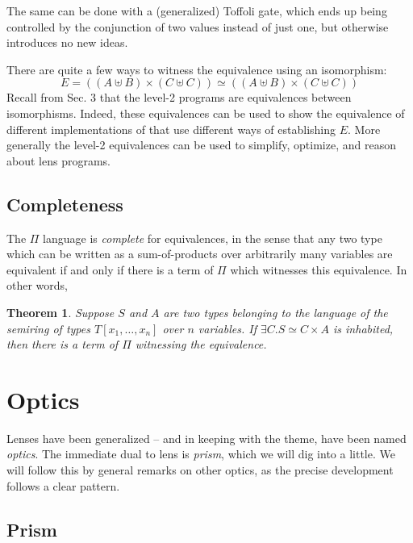 \documentclass[sigplan,review,anonymous]{acmart}
\newtheorem{theorem}{Theorem}[section]
\begin{document}
The same can be done with a (generalized) Toffoli gate, which ends up being
controlled by the conjunction of two values instead of just one, but otherwise
introduces no new ideas.

There are quite a few ways to witness the equivalence using an
isomorphism: \[ E = ((A ⊎ B) × (C ⊎ C)) ≃ ((A ⊎ B) × (C ⊎ C)) \]
Recall from Sec. 3 that the level-2 programs are equivalences between
isomorphisms. Indeed, these equivalences can be used to show the
equivalence of different implementations of 
that use different ways of establishing $E$. More generally the
level-2 equivalences can be used to simplify, optimize, and reason
about lens programs.



\subsection{Completeness}

The $\Pi$ language is \emph{complete} for equivalences, in the sense that
any two type which can be written as a sum-of-products over arbitrarily many
variables are equivalent if and only if there is a term of $\Pi$ which witnesses
this equivalence.  In other words,

\begin{theorem}
Suppose $S$ and $A$ are two types belonging to the language of the
semiring of types $T\left[x_{1},\ldots,x_{n}\right]$ over $n$ variables.
If $∃C. S ≃ C × A$ is inhabited, then there is a term of $\Pi$ witnessing
the equivalence.
\end{theorem}

\section{Optics}

Lenses have been generalized -- and in keeping with the theme, have been
named \emph{optics}. The immediate dual to lens is \emph{prism}, which
we will dig into a little. We will follow this by general remarks on
other optics, as the precise development follows a clear pattern.

\subsection{Prism}
\end{document}
